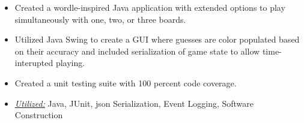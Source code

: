 \begin{itemize}
  \item Created a wordle-inspired Java application with extended options to play simultaneously with one, two, or three boards.
  \item Utilized Java Swing to create a GUI where guesses are color populated based on their accuracy and included serialization of game state to allow time-interupted playing.
  \item Created a unit testing suite with 100 percent code coverage.
  \item \underline{\textit{Utilized:}} Java, JUnit, json Serialization, Event Logging, Software Construction
\end{itemize}





